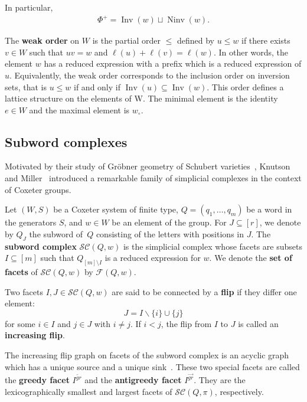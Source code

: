 \documentclass{amsart}
\theoremstyle{definition}
\DeclareMathOperator{\Inv}{Inv} %
\DeclareMathOperator{\Ninv}{Ninv} %
\newcommand{\defn}[1]{\textbf{\textsf{\color{PineGreen} #1}}} %
\newcommand{\cesar}[1]{\todo[color=orange!30,inline]{#1 \\ \hfill --- C.}}
\newcommand{\wo}{w_\circ} %
\newcommand{\subwordComplex}{\mathcal{SC}} %
\newcommand{\subwordFacets}{\mathcal{F}} %
\newcommand{\greedyFacet}{I^{\overleftarrow{gr}}} %
\newcommand{\antiGreedyFacet}{I^{\overrightarrow{gr}}} %
\begin{document}
In particular, 
\begin{align}
\Phi^+=\Inv(w) \sqcup \Ninv (w).
\end{align}

The \defn{weak order} on $W$ is the partial order $\leq$ defined by $u \leq w$ if there exists $v \in W$ such that $uv = w$ and $\ell(u) + \ell(v) = \ell(w)$.
In other words, the element $w$ has a reduced expression with a prefix which is a reduced expression of $u$.
Equivalently, the weak order corresponds to the inclusion order on inversion sets, that is $u \leq w$ if and only if $\Inv(u) \subseteq \Inv(w)$.
This order defines a lattice structure on the elements of W.
The minimal element is the identity $e \in W$ and the maximal element is $\wo$.


\subsection{Subword complexes}

Motivated by their study of Gröbner geometry of Schubert varieties~\cite{KnutsonMiller-GroebnerGeometry}, Knutson and Miller~\cite{KnutsonMiller-subwordComplex} introduced a remarkable family of simplicial complexes in the context of Coxeter groups.

Let $(W,S)$ be a Coxeter system of finite type, $Q=(q_1,\dots,q_m)$ be a word in the generators $S$, and $w\in W$ be an element of the group.
For $J\subseteq [r]$, we denote by $Q_J$ the subword of~$Q$ consisting of the letters with positions in $J$.
The \defn{subword complex} $\subwordComplex(Q,w)$ is the simplicial complex whose facets are subsets $I\subseteq [m]$ such that $Q_{[m]\setminus I}$ is a reduced expression for $w$.
We denote the \defn{set of facets} of $\subwordComplex(Q,w)$ by $\subwordFacets(Q,w)$.

Two facets $I,J\in\subwordComplex(Q,w)$ are said to be connected by a \defn{flip} if they differ one element:
\[J=I\smallsetminus \{i\} \cup\{j\}\]
for some $i\in I$ and $j\in J$ with $i\neq j$.
If $i<j$, the flip from $I$ to $J$ is called an \defn{increasing flip}.

The increasing flip graph on facets of the subword complex is an acyclic graph which has a unique source and a unique sink~\cite{Pilaud-greedyFlipTree, PilaudStump-ELlabelings}.
These two special facets are called the \defn{greedy facet} $\greedyFacet$ and the \defn{antigreedy facet} $\antiGreedyFacet$.
They are the lexicographically smallest and largest facets of $\subwordComplex(Q,\pi)$, respectively.
\end{document}
